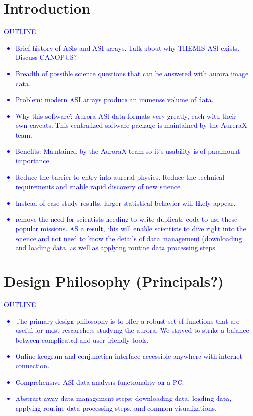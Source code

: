 \documentclass[draft]{agujournal2019}
\begin{document}
\section{Introduction}\label{intro}
\textcolor{blue}{
      OUTLINE
      \begin{itemize}
            \item Brief history of ASIs and ASI arrays. Talk about why THEMIS ASI exists. Discuss CANOPUS?
            \item Breadth of possible science questions that can be answered with aurora image data.
            \item Problem: modern ASI arrays produce an immense volume of data.
            \item Why this software? Aurora ASI data formats very greatly, each with their own caveats. This centralized software package is maintained by the AuroraX team. 
            \item Benefits: Maintained by the AuroraX team so it's usability is of paramount importance
            \item Reduce the barrier to entry into auroral physics. Reduce the technical requirements and  enable rapid discovery of new science.
            \item Instead of case study results, larger statistical behavior will likely appear.
            \item remove the need for scientists needing to write duplicate code to use these popular missions. AS a result, this will enable scientists to dive right into the science and not need to know the details of data management (downloading and loading data, as well as applying routine data processing steps
      \end{itemize}
}


\section{Design Philosophy (Principals?)}
\textcolor{blue}{
      OUTLINE
      \begin{itemize}
            \item The primary design philosophy is to offer a robust set of functions that are useful for most researchers studying the aurora. We strived to strike a balance between complicated and user-friendly tools. 
            \item Online keogram and conjunction interface accessible anywhere with internet connection.
            \item Comprehensive ASI data analysis functionality on a PC.
            \item Abstract away data management steps: downloading data, loading data, applying routine data processing steps, and common visualizations.
      \end{itemize}
}
\end{document}
